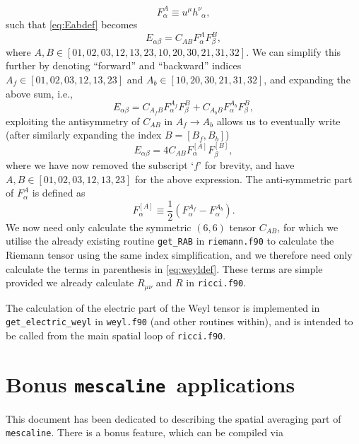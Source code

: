\documentclass[a4paper]{article}
\newcommand{\ph}{\phantom}
\newcommand{\alp}{\alpha}
\newcommand{\mesc}{\texttt{mescaline}}
\begin{document}
\begin{equation}
	F^A_\alp \equiv u^\mu h^\nu_{\ph{\nu}\alp},
\end{equation}
such that \eqref{eq:Eabdef} becomes
\begin{equation}
	E_{\alp\beta} = C_{AB} F^A_\alp F^B_\beta,
\end{equation}
where $A,B\in[01,02,03,12,13,23,10,20,30,21,31,32]$. We can simplify this further by denoting ``forward'' and ``backward'' indices $A_f\in[01,02,03,12,13,23]$ and $A_b\in[10,20,30,21,31,32]$, and expanding the above sum, i.e.,
\begin{equation}
	E_{\alp\beta} = C_{A_f B} F^{A_f}_\alp F^B_\beta + C_{A_b B} F^{A_b}_\alp F^B_\beta,
\end{equation}
exploiting the antisymmetry of $C_{AB}$ in $A_f\rightarrow A_b$ allows us to eventually write (after similarly expanding the index $B=[B_f,B_b]$)
\begin{equation}
	E_{\alp\beta} = 4 C_{A B} F^{[A]}_\alp F^{[B]}_\beta,
\end{equation}
where we have now removed the subscript `$f$' for brevity, and have $A,B\in[01,02,03,12,13,23]$ for the above expression. The anti-symmetric part of $F^A_\alp$ is defined as
\begin{equation}
	F^{[A]}_\alp \equiv \frac{1}{2}\left( F^{A_f}_\alp - F^{A_b}_\alp \right).
\end{equation}
We now need only calculate the symmetric $(6,6)$ tensor $C_{AB}$, for which we utilise the already existing routine \texttt{get\_RAB} in \texttt{riemann.f90} to calculate the Riemann tensor using the same index simplification, and we therefore need only calculate the terms in parenthesis in \eqref{eq:weyldef}. These terms are simple provided we already calculate $R_{\mu\nu}$ and $R$ in \texttt{ricci.f90}.

The calculation of the electric part of the Weyl tensor is implemented in \texttt{get\_electric\_weyl} in \texttt{weyl.f90} (and other routines within), and is intended to be called from the main spatial loop of \texttt{ricci.f90}.


\section{Bonus \mesc\, applications}

This document has been dedicated to describing the spatial averaging part of \mesc. There is a bonus feature, which can be compiled via
\end{document}
